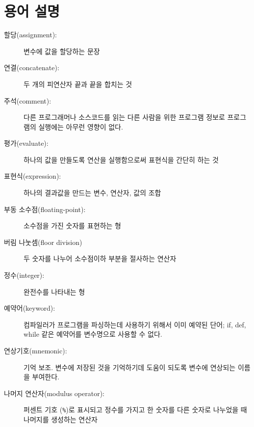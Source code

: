 

\section{용어 설명}

\begin{description}

\item[할당(assignment):] 변수에 값을 할당하는 문장

\item[연결(concatenate):] 두 개의 피연산자 끝과 끝을 합치는 것

\item[주석(comment):] 다른 프로그래머나 소스코드를 읽는 다른 사람을 위한 프로그램 정보로 프로그램의 실행에는 아무런 영향이 없다.

\item[평가(evaluate):] 하나의 값을 만들도록 연산을 실행함으로써 표현식을 간단히 하는 것

\item[표현식(expression):] 하나의 결과값을 만드는 변수, 연산자, 값의 조합

\item[부동 소수점(floating-point):] 소수점을 가진 숫자를 표현하는 형

\item[버림 나눗셈(floor division)] 두 숫자를 나누어 소수점이하 부분을 절사하는 연산자

\item[정수(integer):] 완전수를 나타내는 형

\item[예약어(keyword):] 컴파일러가 프로그램을 파싱하는데 사용하기 위해서 이미 예약된 단어; if, def, while 같은 예약어를 변수명으로 사용할 수 없다.

\item[연상기호(mnemonic):] 기억 보조. 변수에 저장된 것을 기억하기데 도움이 되도록 변수에 연상되는 이름을 부여한다.

\item[나머지 연산자(modulus operator):] 
퍼센트 기호 ({\tt \%})로 표시되고 정수를 가지고 한 숫자를 다른 숫자로 나누었을 때 나머지를 생성하는 연산자


\end{description}
